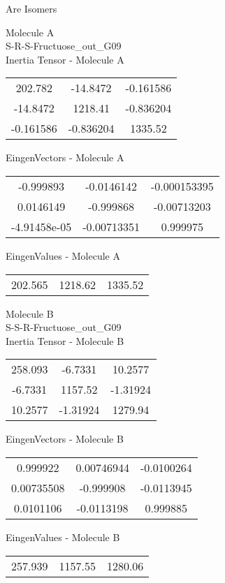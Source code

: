 \begin{center}
\vtab
\vtab
\textcolor{NavyBlue}{\Large Are Isomers}
\end{center}
\newpage
\begin{multicols}{2}
\begin{center}
Molecule A \\ 
S-R-S-Fructuose\_out\_G09
\\
Inertia Tensor - Molecule A \\
\vtab
\begin{tabular}{|c c c|}
202.782	 & 	-14.8472	 & 	-0.161586	 \\
-14.8472	 & 	1218.41	 & 	-0.836204	 \\
-0.161586	 & 	-0.836204	 & 	1335.52
\end{tabular}

\vtab
 EingenVectors - Molecule A     \\
\vtab
\begin{tabular}{|c c c|}
-0.999893	 & 	-0.0146142	 & 	-0.000153395	 \\
0.0146149	 & 	-0.999868	 & 	-0.00713203	 \\
-4.91458e-05	 & 	-0.00713351	 & 	0.999975
\end{tabular}

\vtab
 EingenValues - Molecule A     \\
\vtab
\begin{tabular}{|c c c|}
202.565	 & 	1218.62	 & 	1335.52
\end{tabular}
\columnbreak

Molecule B \\ 
S-S-R-Fructuose\_out\_G09
\\
Inertia Tensor - Molecule B \\
\vtab
\begin{tabular}{|c c c|}
258.093	 & 	-6.7331	 & 	10.2577	 \\
-6.7331	 & 	1157.52	 & 	-1.31924	 \\
10.2577	 & 	-1.31924	 & 	1279.94
\end{tabular}

\vtab
 EingenVectors - Molecule B     \\
\vtab
\begin{tabular}{|c c c|}
0.999922	 & 	0.00746944	 & 	-0.0100264	 \\
0.00735508	 & 	-0.999908	 & 	-0.0113945	 \\
0.0101106	 & 	-0.0113198	 & 	0.999885
\end{tabular}

\vtab
 EingenValues - Molecule B     \\
\vtab
\begin{tabular}{|c c c|}
257.939	 & 	1157.55	 & 	1280.06
\end{tabular}

\end{center}
\end{multicols}
